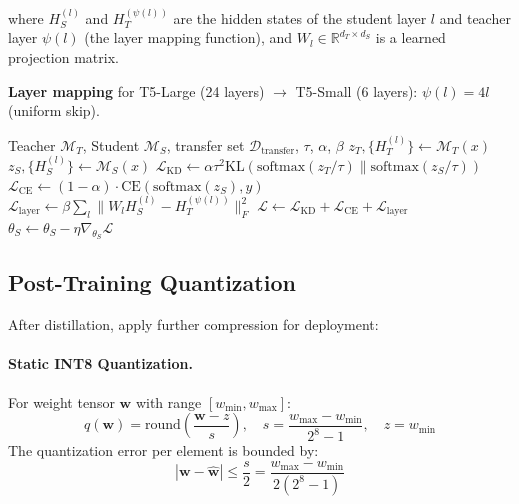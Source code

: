 \documentclass[11pt, a4paper]{article}
\newcommand{\R}{\mathbb{R}}
\begin{document}
where $H_S^{(l)}$ and $H_T^{(\psi(l))}$ are the hidden states of the student layer $l$ and teacher layer $\psi(l)$ (the layer mapping function), and $W_l \in \R^{d_T \times d_S}$ is a learned projection matrix.

\textbf{Layer mapping} for T5-Large (24 layers) $\rightarrow$ T5-Small (6 layers): $\psi(l) = 4l$ (uniform skip).

\begin{algorithm}[H]
\caption{Multi-Objective Distillation Training}
\label{alg:distill}
\begin{algorithmic}[1]
\Require Teacher $\mathcal{M}_T$, Student $\mathcal{M}_S$, transfer set $\mathcal{D}_{\text{transfer}}$, $\tau$, $\alpha$, $\beta$
        \State $z_T, \{H_T^{(l)}\} \leftarrow \mathcal{M}_T(x)$ 
        \State $z_S, \{H_S^{(l)}\} \leftarrow \mathcal{M}_S(x)$ 
        \State $\mathcal{L}_{\text{KD}} \leftarrow \alpha \tau^2 \text{KL}(\text{softmax}(z_T/\tau) \| \text{softmax}(z_S/\tau))$
        \State $\mathcal{L}_{\text{CE}} \leftarrow (1-\alpha) \cdot \text{CE}(\text{softmax}(z_S), y)$
        \State $\mathcal{L}_{\text{layer}} \leftarrow \beta \sum_l \|W_l H_S^{(l)} - H_T^{(\psi(l))}\|_F^2$
        \State $\mathcal{L} \leftarrow \mathcal{L}_{\text{KD}} + \mathcal{L}_{\text{CE}} + \mathcal{L}_{\text{layer}}$
        \State $\theta_S \leftarrow \theta_S - \eta \nabla_{\theta_S} \mathcal{L}$
    \EndFor
\EndFor
\end{algorithmic}
\end{algorithm}

\subsection{Post-Training Quantization}

After distillation, apply further compression for deployment:

\paragraph{Static INT8 Quantization.}
For weight tensor $\mathbf{w}$ with range $[w_{\min}, w_{\max}]$:
\begin{equation}
q(\mathbf{w}) = \text{round}\!\left(\frac{\mathbf{w} - z}{s}\right), \quad s = \frac{w_{\max} - w_{\min}}{2^8 - 1}, \quad z = w_{\min}
\end{equation}
The quantization error per element is bounded by:
\begin{equation}
|\mathbf{w} - \hat{\mathbf{w}}| \leq \frac{s}{2} = \frac{w_{\max} - w_{\min}}{2(2^8 - 1)}
\end{equation}
\end{document}
